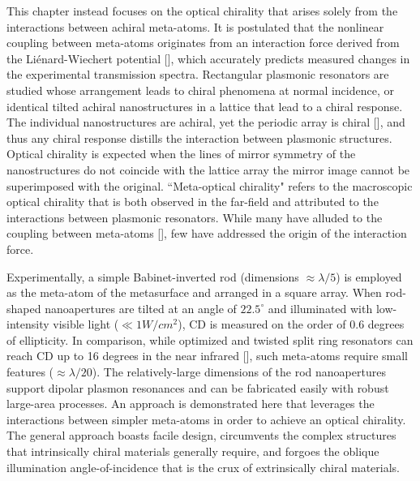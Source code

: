 This chapter instead focuses on the optical chirality that arises solely from the interactions between achiral meta-atoms. It is postulated that the nonlinear coupling between meta-atoms originates from an interaction force derived from the Li\'{e}nard-Wiechert potential [\cite{jackson}], which accurately predicts measured changes in the experimental transmission spectra.  Rectangular plasmonic resonators are studied whose arrangement leads to chiral phenomena at normal incidence, or identical tilted achiral nanostructures in a lattice that lead to a chiral response. The individual nanostructures are achiral, yet the periodic array is chiral [\cite{Plum11, Prosvirnin}], and thus any chiral response distills the interaction between plasmonic structures. Optical chirality is expected when the lines of mirror symmetry of the nanostructures do not coincide with the lattice array \textemdash the mirror image cannot be superimposed with the original. ``Meta-optical chirality" refers to the macroscopic optical chirality that is both observed in the far-field and attributed to the interactions between plasmonic resonators.  While many have alluded to the coupling between meta-atoms [\cite{Hentschel, Hentschel:10, Metzger, Na, Rozin}], few have addressed the origin of the interaction force.  
 
Experimentally, a simple Babinet-inverted rod (dimensions $\approx \lambda/5$) is employed as the meta-atom of the metasurface and arranged in a square array. When rod-shaped nanoapertures are tilted at an angle of $22.5^\circ$ and illuminated with low-intensity visible light ($\ll 1W/cm^2$), CD is measured on the order of 0.6 degrees of ellipticity.  In comparison, while optimized and twisted split ring resonators can reach CD up to 16 degrees in the near infrared [\cite{Decker}], such meta-atoms require small features ($\approx \lambda/20$). The relatively-large dimensions of the rod nanoapertures support dipolar plasmon resonances and can be fabricated easily with robust large-area processes. An approach is demonstrated here that leverages the interactions between simpler meta-atoms in order to achieve an optical chirality.  The general approach boasts facile design, circumvents the complex structures that intrinsically chiral materials generally require, and forgoes the oblique illumination angle-of-incidence that is the crux of extrinsically chiral materials.

